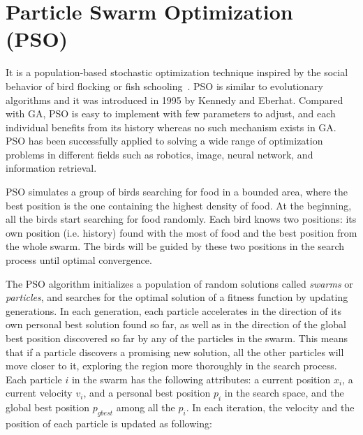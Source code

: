 \section{Particle Swarm Optimization (PSO)}
It is a population-based stochastic optimization technique inspired by the social behavior of bird flocking or fish schooling~\cite{Kennedy:ICNN95}. PSO is similar to evolutionary algorithms and it was introduced in 1995 by Kennedy and Eberhat. Compared with GA, PSO is easy to implement with few parameters to adjust, and each individual  benefits from its history whereas no such mechanism exists in GA. PSO has been successfully applied to solving a wide range of optimization problems in different fields such as robotics, image, neural network, and information retrieval.

PSO simulates a group of birds searching for food in a bounded area, where the best position is the one containing the highest density of food. At the beginning, all the birds start searching for food randomly. Each bird knows two positions: its own position (i.e. history) found with the most of food and the best position from the whole swarm. The birds will be guided by these two positions in the search process until optimal convergence.

The PSO algorithm initializes a population of random solutions called \emph{swarms} or \emph{particles}, and searches for the optimal solution of a fitness function by updating generations. In each generation, each particle accelerates in the direction of its own personal best solution found so far, as well as in the direction of the global best position discovered so far by any of the particles in the swarm. This means that if a particle discovers a promising new solution, all the other particles will move closer to it, exploring the region more thoroughly in the search process. Each particle $i$ in the swarm has the following attributes: a current position $x_{i}$, a current velocity $v_{i}$, and a personal best position $p_{i}$ in the search space, and the global best position $p_{gbest}$ among all the $p_{i}$. In each iteration, the velocity and the position of each particle is updated as following:

